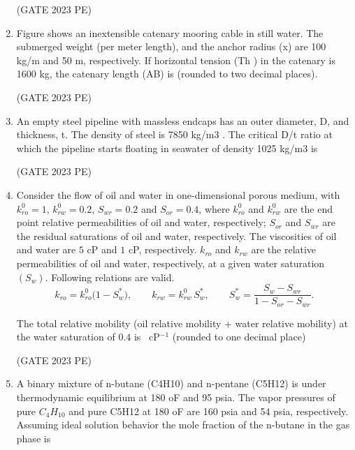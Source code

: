 \documentclass[journal,12pt,onecolumn]{exam}
\theoremstyle{remark}
\begin{document}
\begin{enumerate}
\hfill{(GATE 2023 PE)}
\item Figure shows an inextensible catenary mooring cable in still water. The
submerged weight (per meter length), and the anchor radius (x) are 100 kg/m and
50 m, respectively. If horizontal tension (Th ) in the catenary is 1600 kg, the
catenary length (AB) is  (rounded to two decimal places).

\hfill{(GATE 2023 PE)}
\item An empty steel pipeline with massless endcaps has an outer diameter, D, and
thickness, t. The density of steel is 7850 kg/m3 . The critical D/t ratio at which the
pipeline starts floating in seawater of density 1025 kg/m3 is

\hfill{(GATE 2023 PE)}
\item Consider the flow of oil and water in one-dimensional porous medium, with 
$k_{ro}^0 = 1$, $k_{rw}^0 = 0.2$, $S_{wr} = 0.2$ and $S_{or} = 0.4$, where $k_{ro}^0$ and $k_{rw}^0$ are the end point
relative permeabilities of oil and water, respectively; $S_{or}$ and $S_{wr}$ are the residual
saturations of oil and water, respectively. The viscosities of oil and water are $5$ cP
and $1$ cP, respectively. $k_{ro}$ and $k_{rw}$ are the relative permeabilities of oil and water,
respectively, at a given water saturation $(S_w)$. Following relations are valid.
\[
k_{ro} = k_{ro}^0 \bigl(1 - S_w^*\bigr), \qquad
k_{rw} = k_{rw}^0 \, S_w^*, \qquad
S_w^*=\frac{S_w-S_{wr}}{1-S_{or}-S_{wr}}.
\]

The total relative mobility (oil relative mobility + water relative mobility) at the water
saturation of $0.4$ is \underline{\hspace{2cm}}~cP$^{-1}$ (rounded to one decimal place)

\hfill{(GATE 2023 PE)}
\item A binary mixture of n-butane (C4H10) and n-pentane (C5H12) is under
thermodynamic equilibrium at 180 oF and 95 psia. The vapor pressures of pure
$C_4H_{10}$ and pure C5H12 at 180 oF are 160 psia and 54 psia, respectively.
Assuming ideal solution behavior 
the mole fraction of the n-butane in the gas phase is


\end{enumerate}
\end{document}
